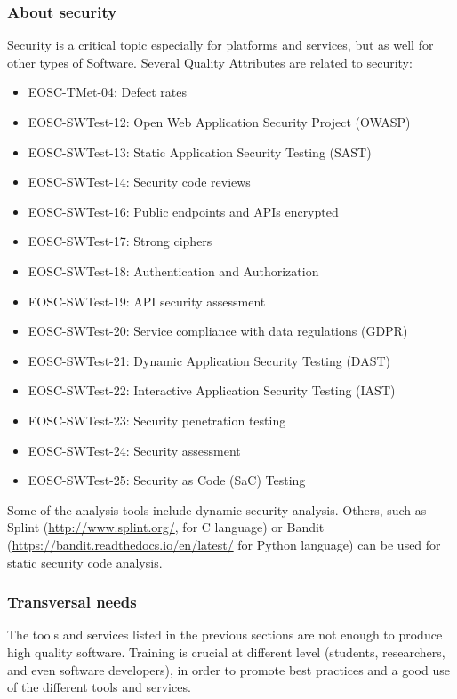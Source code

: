 \subsubsection{About security}

Security is a critical topic especially for platforms and services, but as well for other types of Software. Several Quality Attributes are related to security:

\begin{itemize}
  \item EOSC-TMet-04: Defect rates
  \item EOSC-SWTest-12: Open Web Application Security Project (OWASP)
  \item EOSC-SWTest-13: Static Application Security Testing (SAST)
  \item EOSC-SWTest-14: Security code reviews
  \item EOSC-SWTest-16: Public endpoints and APIs encrypted
  \item EOSC-SWTest-17: Strong ciphers
  \item EOSC-SWTest-18: Authentication and Authorization
  \item EOSC-SWTest-19: API security assessment
  \item EOSC-SWTest-20: Service compliance with data regulations (GDPR)
  \item EOSC-SWTest-21: Dynamic Application Security Testing (DAST)
  \item EOSC-SWTest-22: Interactive Application Security Testing (IAST)
  \item EOSC-SWTest-23: Security penetration testing
  \item EOSC-SWTest-24: Security assessment
  \item EOSC-SWTest-25: Security as Code (SaC) Testing
\end{itemize}

Some of the analysis tools include dynamic security analysis. Others, such as Splint (\url{http://www.splint.org/}, for C language) or  Bandit (\url{https://bandit.readthedocs.io/en/latest/} for Python language) can be used for static security code analysis.

\subsubsection{Transversal needs}

The tools and services listed in the previous sections are not enough to produce high quality software. Training is crucial at different level (students, researchers, and even software developers), in order to promote best practices and a good use of the different tools and services.

